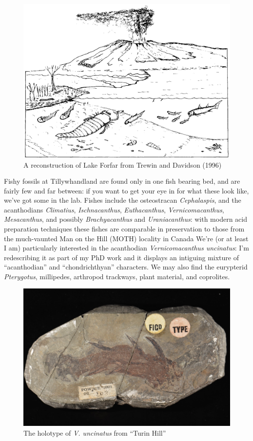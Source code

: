 \documentclass[12pt,letterpaper]{article}
\begin{document}
\begin{figure}[h!]
\caption{A reconstruction of Lake Forfar from Trewin and Davidson (1996)}
\includegraphics[scale=0.6]{Lake_Forfar}
\centering
\end{figure}

Fishy fossils at Tillywhandland are found only in one fish bearing bed, and are fairly few and far between: if you want to get your eye in for what these look like, we've got some in the lab. Fishes include the osteostracan \textit{Cephalaspis}, and the acanthodians \textit{Climatius}, \textit{Ischnacanthus}, \textit{Euthacanthus}, \textit{Vernicomacanthus}, \textit{Mesacanthus}, and possibly \textit{Brachyacanthus} and \textit{Uraniacanthus}: with modern acid preparation techniques these fishes are comparable in preservation to those from the much-vaunted Man on the Hill (MOTH) locality in Canada  We're (or at least I am) particularly interested in the acanthodian \textit{Vernicomacanthus uncinatus}: I'm redescribing it as part of my PhD work and it displays an intiguing mixture of ``acanthodian'' and ``chondrichthyan'' characters.  We may also find the eurypterid \textit{Pterygotus}, millipedes, arthropod trackways, plant material, and coprolites.  \newline

\begin{figure}[h!]
\caption{The holotype of \textit{V. uncinatus} from ``Turin Hill''}
\includegraphics[scale=0.35]{Vernicomacanthus}
\centering
\end{figure}
\end{document}
